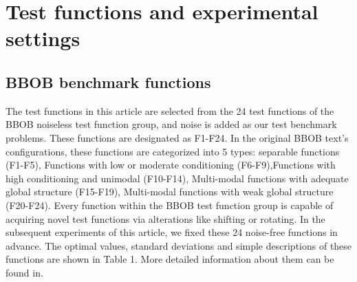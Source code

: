 \documentclass{article}
\begin{document}
\section{Test functions and experimental settings}
\subsection{BBOB benchmark functions}

\hspace{2em}The test functions in this article are selected from the 24 test functions of the BBOB noiseless test function group, and noise is added as our test benchmark problems. These functions are designated as F1-F24. In the original BBOB text's configurations, these functions are categorized into 5 types: separable functions (F1-F5), Functions with low or moderate conditioning (F6-F9),Functions with high conditioning and unimodal (F10-F14), Multi-modal functions with adequate global structure (F15-F19), Multi-modal functions with weak global structure (F20-F24). Every function within the BBOB test function group is capable of acquiring novel test functions via alterations like shifting or rotating. In the subsequent experiments of this article, we fixed these 24 noise-free functions in advance. The optimal values, standard deviations and simple descriptions of these functions are shown in Table 1. More detailed information about them can be found in\citep{Hansen2010RealParameterBO}.
\end{document}
